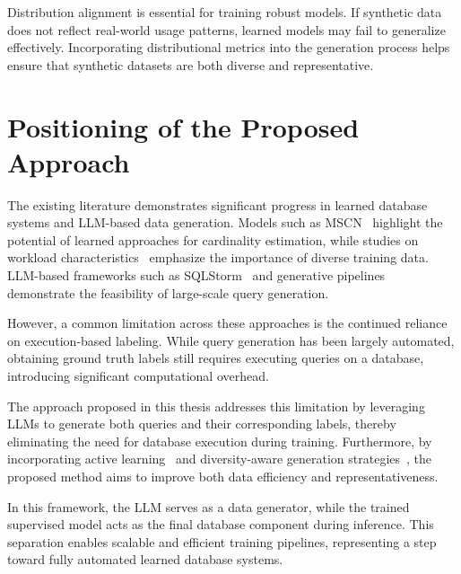 Distribution alignment is essential for training robust models. If synthetic data does not reflect real-world usage patterns, learned models may fail to generalize effectively. Incorporating distributional metrics into the generation process helps ensure that synthetic datasets are both diverse and representative.

\section{Positioning of the Proposed Approach}

The existing literature demonstrates significant progress in learned database systems and LLM-based data generation. Models such as MSCN~\cite{DBLP:conf/cidr/KipfKRLBK19} highlight the potential of learned approaches for cardinality estimation, while studies on workload characteristics~\cite{DBLP:journals/pvldb/WangQWWZ21} emphasize the importance of diverse training data. LLM-based frameworks such as SQLStorm~\cite{DBLP:journals/pvldb/SchmidtLBN25} and generative pipelines~\cite{DBLP:journals/corr/abs-2512-20271} demonstrate the feasibility of large-scale query generation.

However, a common limitation across these approaches is the continued reliance on execution-based labeling. While query generation has been largely automated, obtaining ground truth labels still requires executing queries on a database, introducing significant computational overhead.

The approach proposed in this thesis addresses this limitation by leveraging LLMs to generate both queries and their corresponding labels, thereby eliminating the need for database execution during training. Furthermore, by incorporating active learning~\cite{DBLP:journals/tnn/LiWCJDO25} and diversity-aware generation strategies~\cite{DBLP:journals/corr/abs-2503-24228}, the proposed method aims to improve both data efficiency and representativeness.

In this framework, the LLM serves as a data generator, while the trained supervised model acts as the final database component during inference. This separation enables scalable and efficient training pipelines, representing a step toward fully automated learned database systems.